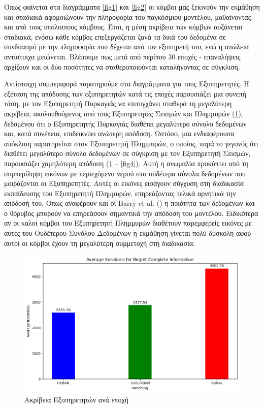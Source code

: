 \newpage

Όπως φαίνεται στα διαγράμματα \ref{fig1} και \ref{fig2} οι κόμβοι μας ξεκινούν την εκμάθηση και σταδιακά αφομοιώνουν την πληροφορία του παγκόσμιου μοντέλου, μαθαίνοντας και από τους υπόλοιπους κόμβους. Έτσι, η μέση ακρίβεια των κόμβων αυξάνεται σταδιακά, ενόσω κάθε κόμβος επεξεργάζεται ξανά τα δικά του δεδομένα σε συνδυασμό με την πληροφορία που δέχεται από τον εξυπηρετή του, ενώ η απώλεια αντίστοιχα μειώνεται. Βλέπουμε πως μετά από περίπου 30 εποχές - επαναλήψεις αρχίζουν και οι δύο ποσότητες να σταθεροποιούνται καταλήγοντας σε σύγκλιση.

Αντίστοιχη συμπεριφορά παρατηρούμε στα διαγράμματα για τους Εξυπηρετητές. Η εξέταση της απόδοσης των εξυπηρετητών κατά τις εποχές παρουσιάζει μια συνεπή τάση, με τον Εξυπηρετητή Πυρκαγιάς να επιτυγχάνει σταθερά τη μεγαλύτερη ακρίβεια, ακολουθούμενος από τους Εξυπηρετητές Σεισμών και Πλημμυρών (\ref{fig3}), δεδομένου ότι ο Εξυπηρετητής Πυρκαγιάς διαθέτει μεγαλύτερο σύνολο δεδομένων και, κατά συνέπεια, επιδεικνύει ανώτερη απόδοση. Ωστόσο, μια ενδιαφέρουσα απόκλιση παρατηρείται στον Εξυπηρετητή Πλημμυρών, ο οποίος, παρά το γεγονός ότι διαθέτει μεγαλύτερο σύνολο δεδομένων σε σύγκριση με τον Εξυπηρετητή Σεισμών, παρουσιάζει χαμηλότερη απόδοση (\ref{fig3} – \ref{fig4}). Αυτή η ανωμαλία προκύπτει από τη συμπερίληψη εικόνων με περιεχόμενο νερού στα ουδέτερα σύνολα δεδομένων που μοιράζονται οι Εξυπηρετητές. Αυτές οι εικόνες εισάγουν σύγχυση στη διαδικασία εκπαίδευσης του Εξυπηρετητή Πλημμυρών, επηρεάζοντας τελικά αρνητικά την απόδοσή του. Όπως αναφέρουν και οι Barry et al. () η ποιότητα των δεδομένων και ο θόρυβος μπορούν να επηρεάσουν σημαντικά την απόδοση του μοντέλου. Ειδικότερα αν οι καλοί κόμβοι του Εξυπηρετητή Πλημμυρών διαθέτουν παρεμφερείς εικόνες με αυτές του Ουδέτερου Συνόλου Δεδομένων η εκμάθηση γίνεται πολύ δύσκολη αφού αυτοί οι κόμβοι έχουν τη μεγαλύτερη συμμετοχή στη διαδικασία.

\begin{figure}[ht]
    \centering
    \includegraphics[width=\textwidth]{figures/chapter4/Average_Iterations_per_area_RCI.png}
    \caption{Ακρίβεια Εξυπηρετητών ανά εποχή}
    \label{fig3}
\end{figure}


